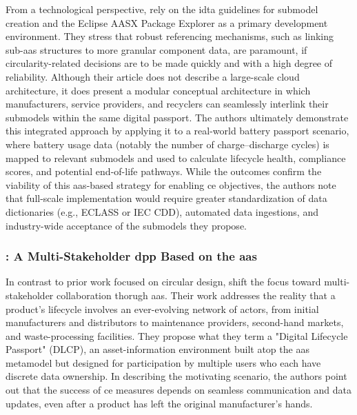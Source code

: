 From a technological perspective,\textcite{Kuhn.2025} rely on the \ac{idta} guidelines for submodel creation and the Eclipse AASX Package Explorer as a primary development environment. They stress that robust referencing mechanisms, such as linking sub-\ac{aas} structures to more granular component data, are paramount, if circularity-related decisions are to be made quickly and with a high degree of reliability. Although their article does not describe a large-scale cloud architecture, it does present a modular conceptual architecture in which manufacturers, service providers, and recyclers can seamlessly interlink their submodels within the same digital passport. The authors ultimately demonstrate this integrated approach by applying it to a real-world battery passport scenario, where battery usage data (notably the number of charge–discharge cycles) is mapped to relevant submodels and used to calculate lifecycle health, compliance scores, and potential end-of-life pathways. While the outcomes confirm the viability of this \ac{aas}-based strategy for enabling \ac{ce} objectives, the authors note that full-scale implementation would require greater standardization of data dictionaries (e.g., ECLASS or IEC CDD), automated data ingestions, and industry-wide acceptance of the submodels they propose. \autocite{Kuhn.2025}

\subsubsection*{\textcite{Pourjafarian.2023}: A Multi-Stakeholder \ac{dpp} Based on the \ac{aas}}
In contrast to prior work focused on circular design, \textcite{Pourjafarian.2023} shift the focus toward multi-stakeholder collaboration thorugh \ac{aas}. Their work addresses the reality that a product’s lifecycle involves an ever-evolving network of actors, from initial manufacturers and distributors to maintenance providers, second-hand markets, and waste-processing facilities. They propose what they term a "Digital Lifecycle Passport" (DLCP), an asset-information environment built atop the \ac{aas} metamodel but designed for participation by multiple users who each have discrete data ownership. In describing the motivating scenario, the authors point out that the success of \ac{ce} measures depends on seamless communication and data updates, even after a product has left the original manufacturer’s hands. \autocite{Pourjafarian.2023}

